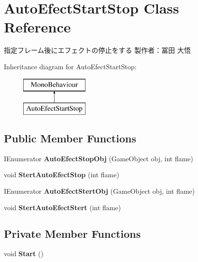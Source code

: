 \hypertarget{class_auto_efect_start_stop}{}\section{Auto\+Efect\+Start\+Stop Class Reference}
\label{class_auto_efect_start_stop}


指定フレーム後にエフェクトの停止をする 製作者：冨田 大悟  


Inheritance diagram for Auto\+Efect\+Start\+Stop\+:\begin{figure}[H]
\begin{center}
\leavevmode
\includegraphics[height=2.000000cm]{class_auto_efect_start_stop}
\end{center}
\end{figure}
\subsection*{Public Member Functions}
\begin{DoxyCompactItemize}
\item 
\mbox{\label{class_auto_efect_start_stop_a0b8a2121f6ed9597839dcd4cec2fb106}} 
I\+Enumerator {\bfseries Auto\+Efect\+Stop\+Obj} (Game\+Object obj, int flame)
\item 
\mbox{\label{class_auto_efect_start_stop_a65703bd5912b78d9e342125d47f51330}} 
void {\bfseries Stert\+Auto\+Efect\+Stop} (int flame)
\item 
\mbox{\label{class_auto_efect_start_stop_acfa65538815b18ed6423fef43d278cdf}} 
I\+Enumerator {\bfseries Auto\+Efect\+Stert\+Obj} (Game\+Object obj, int flame)
\item 
\mbox{\label{class_auto_efect_start_stop_a81e11b3b2df0b26a3f7c8209596e0962}} 
void {\bfseries Stert\+Auto\+Efect\+Stert} (int flame)
\end{DoxyCompactItemize}
\subsection*{Private Member Functions}
\begin{DoxyCompactItemize}
\item 
\mbox{\label{class_auto_efect_start_stop_a4ee0f9186e6c94aa1b91baa19be25d1a}} 
void {\bfseries Start} ()
\end{DoxyCompactItemize}
